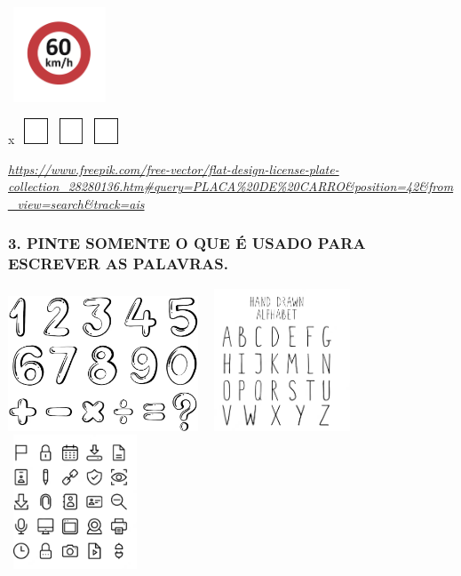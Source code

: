 \includegraphics[width=1.20556in,height=1.11111in]{media/image4.png}

x
\includegraphics[width=0.40972in,height=0.30069in]{media/image5.png}\includegraphics[width=0.40972in,height=0.30069in]{media/image5.png}\includegraphics[width=0.40972in,height=0.30069in]{media/image5.png}

\href{https://www.freepik.com/free-vector/flat-design-license-plate-collection_28280136.htm\#query=PLACA\%20DE\%20CARRO\&position=42\&from_view=search\&track=ais}{\emph{https://www.freepik.com/free-vector/flat-design-license-plate-collection\_28280136.htm\#query=PLACA\%20DE\%20CARRO\&position=42\&from\_view=search\&track=ais}}

\subsubsection{3. PINTE SOMENTE O QUE É USADO PARA ESCREVER AS
PALAVRAS.}\label{pinte-somente-o-que-uxe9-usado-para-escrever-as-palavras.}

\includegraphics[width=2.23393in,height=1.58569in]{media/image6.png}\includegraphics[width=1.96211in,height=1.66818in]{media/image7.png}\includegraphics[width=1.56875in,height=1.56875in]{media/image8.png}

